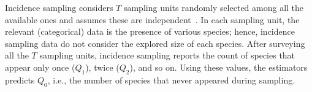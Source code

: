 \documentclass[sigconf,review,anonymous]{acmart}
\begin{document}
%



%
Incidence sampling considers $T$ sampling units randomly selected among all
the available ones and assumes these are independent~\cite{chao2016species}.
%
In each sampling unit, the relevant (categorical) data is the presence of various species;
hence, incidence sampling data do not consider the explored size of each species.
%
After surveying all the $T$ sampling units, incidence sampling reports the count of species
that appear only once ($Q_1$), twice ($Q_2$), and so on. %
%
Using these values, the estimators predicts $Q_0$, i.e., the number of species that never
appeared during sampling.
\end{document}
